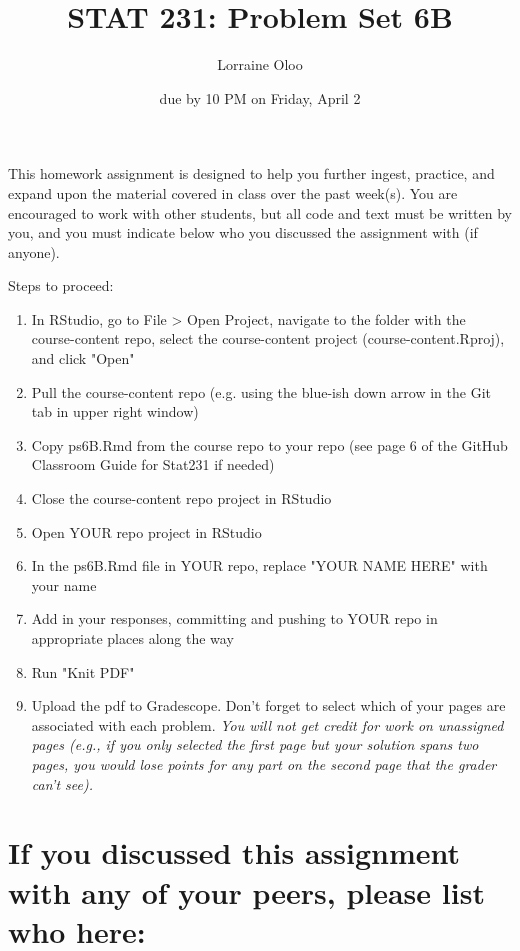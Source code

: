 \documentclass[
]{article}
\title{STAT 231: Problem Set 6B}
\author{Lorraine Oloo}
\date{due by 10 PM on Friday, April 2}
\begin{document}
\maketitle

This homework assignment is designed to help you further ingest,
practice, and expand upon the material covered in class over the past
week(s). You are encouraged to work with other students, but all code
and text must be written by you, and you must indicate below who you
discussed the assignment with (if anyone).

Steps to proceed:

\begin{enumerate}
\item In RStudio, go to File > Open Project, navigate to the folder with the course-content repo, select the course-content project (course-content.Rproj), and click "Open" 
\item Pull the course-content repo (e.g. using the blue-ish down arrow in the Git tab in upper right window)
\item Copy ps6B.Rmd from the course repo to your repo (see page 6 of the GitHub Classroom Guide for Stat231 if needed)
\item Close the course-content repo project in RStudio
\item Open YOUR repo project in RStudio
\item In the ps6B.Rmd file in YOUR repo, replace "YOUR NAME HERE" with your name
\item Add in your responses, committing and pushing to YOUR repo in appropriate places along the way
\item Run "Knit PDF" 
\item Upload the pdf to Gradescope.  Don't forget to select which of your pages are associated with each problem.  \textit{You will not get credit for work on unassigned pages (e.g., if you only selected the first page but your solution spans two pages, you would lose points for any part on the second page that the grader can't see).} 
\end{enumerate}

\newpage

\hypertarget{if-you-discussed-this-assignment-with-any-of-your-peers-please-list-who-here}{%
\section{If you discussed this assignment with any of your peers, please
list who
here:}\label{if-you-discussed-this-assignment-with-any-of-your-peers-please-list-who-here}}
\end{document}
